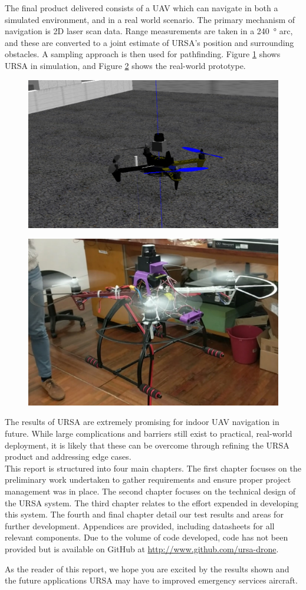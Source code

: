 \documentclass[capstone_report.tex]{subfiles}
\begin{document}
The final product delivered consists of a UAV which can navigate in both a simulated environment, and in a real world scenario. The primary mechanism of navigation is 2D laser scan data. Range measurements are taken in a \SI{240}{\degree} arc, and these are converted to a joint estimate of URSA's position and surrounding obstacles. A sampling approach is then used for pathfinding. Figure \ref{fig:sim} shows URSA in simulation, and Figure \ref{fig:real} shows the real-world prototype. \\


    \begin{figure}  [H]
	\centering
        \includegraphics[width=0.6\linewidth]{imgs/simulation.png}
        \label{fig:sim}
    \end{figure}


    \begin{figure}  [H]
	\centering
        \includegraphics[width=0.6\linewidth]{imgs/real.png}
        \label{fig:real}
    \end{figure}

The results of URSA are extremely promising for indoor UAV navigation in future. While large complications and barriers still exist to practical, real-world deployment, it is likely that these can be overcome through refining the URSA product and addressing edge cases.\\

This report is structured into four main chapters. The first chapter focuses on the preliminary work undertaken to gather requirements and ensure proper project management was in place. The second chapter focuses on the technical design of the URSA system. The third chapter relates to the effort expended in developing this system. The fourth and final chapter detail our test results and areas for further development. Appendices are provided, including datasheets for all relevant components. Due to the volume of code developed, code has not been provided but is available on GitHub at \url{http://www.github.com/ursa-drone}.

As the reader of this report, we hope you are excited by the results shown and the future applications URSA may have to improved emergency services aircraft.
\end{document}
